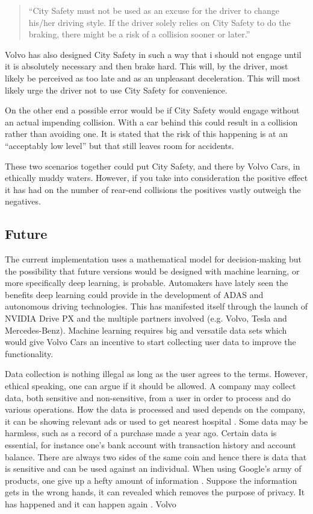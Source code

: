 \documentclass[conference]{IEEEtran}
\begin{document}
\begin{quotation}
	``City Safety must not be used as an excuse for the driver to change his/her driving style. If the driver solely relies on City Safety to do the braking, there might be a risk of a collision sooner or later.'' \cite{CitySafetyLegal}
\end{quotation}

Volvo has also designed City Safety in such a way that i should not engage until it is absolutely necessary and then brake hard. This will, by the driver, most likely be perceived as too late and as an unpleasant deceleration. This will most likely urge the driver not to use City Safety for convenience.

On the other end a possible error would be if City Safety would engage without an actual impending collision. With a car behind this could result in a collision rather than avoiding one. It is stated that the risk of this happening is at an ``acceptably low level'' \cite{SysDescription} but that still leaves room for accidents.

These two scenarios together could put City Safety, and there by Volvo Cars, in ethically muddy waters. However, if you take into consideration the positive effect it has had on the number of rear-end collisions \cite{CitySafety} the positives vastly outweigh the negatives.

\subsection{Future}
The current implementation uses a mathematical model for decision-making but the possibility that future versions would be designed with machine learning, or more specifically deep learning, is probable. \cite{SysDescription} Automakers have lately seen the benefits deep learning could provide in the development of ADAS and autonomous driving technologies. This has manifested itself through the launch of NVIDIA Drive PX and the multiple partners involved (e.g. Volvo, Tesla and Mercedes-Benz). \cite{DrivePX} Machine learning requires big and versatile data sets which would give Volvo Cars an incentive to start collecting user data to improve the functionality.

Data collection is nothing illegal as long as the user agrees to the terms. However, ethical speaking, one can argue if it should be allowed. A company may collect data, both sensitive and non-sensitive, from a user in order to process and do various operations. How the data is processed and used depends on the company, it can be showing relevant ads or used to get nearest hospital \cite{GoogleAds,GoogleNearby,GoogleUserData}. Some data may be harmless, such as a record of a purchase made a year ago. Certain data is essential, for instance one's bank account with transaction history and account balance. There are always two sides of the same coin and hence there is data that is sensitive and can be used against an individual. When using Google's army of products, one give up a hefty amount of information \cite{GoogleUserData}. Suppose the information gets in the wrong hands, it can revealed which removes the purpose of privacy. It has happened and it can happen again \cite{TheFappening,EdwardSnowden}. 
Volvo
\end{document}
